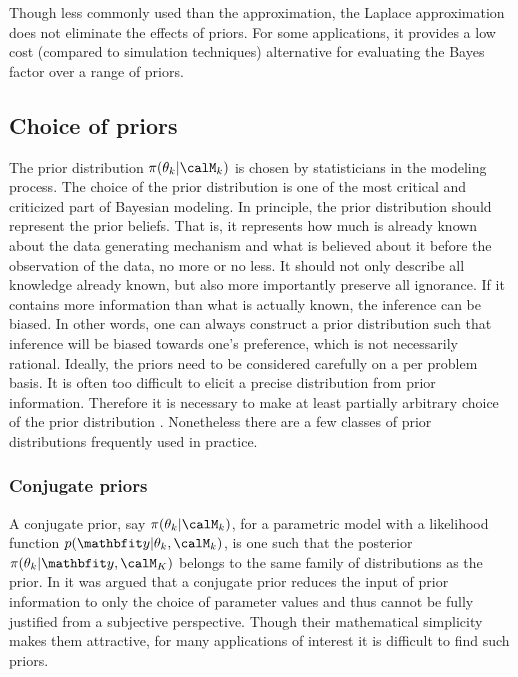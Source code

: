 Though less commonly used than the \bic approximation, the Laplace
approximation does not eliminate the effects of priors. For some
applications, it provides a low cost (compared to simulation techniques)
alternative for evaluating the Bayes factor over a range of priors.

\subsection{Choice of priors}
\label{sub:Choice of priors}

The prior distribution $\pi(\theta_k|\calM_k)$ is chosen by statisticians in
the modeling process. The choice of the prior distribution is one of the most
critical and criticized part of Bayesian modeling. In principle, the prior
distribution should represent the prior beliefs. That is, it represents how
much is already known about the data generating mechanism and what is
believed about it before the observation of the data, no more or no less. It
should not only describe all knowledge already known, but also more
importantly preserve all ignorance. If it contains more information than what
is actually known, the inference can be biased. In other words, one can
always construct a prior distribution such that inference will be biased
towards one's preference, which is not necessarily rational. Ideally, the
priors need to be considered carefully on a per problem basis. It is often
too difficult to elicit a precise distribution from prior information.
Therefore it is necessary to make at least partially arbitrary choice of the
prior distribution \cite[][chap.~3]{Robert:2007tc}\cite{Kass:1995vb}.
Nonetheless there are a few classes of prior distributions frequently used in
practice.

\subsubsection{Conjugate priors}
\label{ssub:Conjugate priors}

A conjugate prior, say $\pi(\theta_k|\calM_k)$, for a parametric model with a
likelihood function $p(\data|\theta_k,\calM_k)$, is one such that the
posterior $\pi(\theta_k|\data,\calM_K)$ belongs to the same family of
distributions as the prior. In \cite[][sec.~5.2]{Bernardo:1994vd} it was
argued that a conjugate prior reduces the input of prior information to only
the choice of parameter values and thus cannot be fully justified from a
subjective perspective. Though their mathematical simplicity makes them
attractive, for many applications of interest it is difficult to find such
priors.

